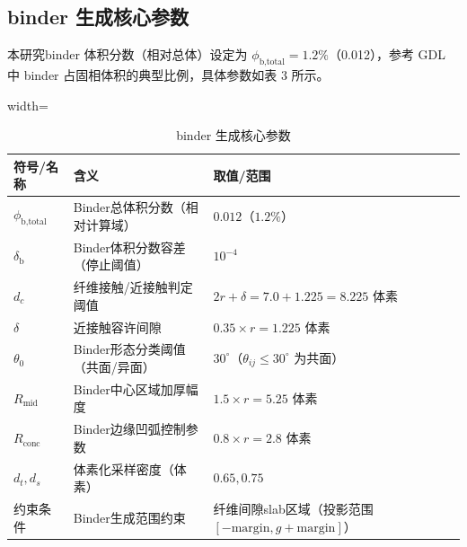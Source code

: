 \subsection{binder 生成核心参数}
{\raggedright
\hspace{2em}本研究binder 体积分数（相对总体）设定为 \(\phi_{\text{b,total}} = 1.2\%\)（0.012），参考 GDL 中 binder 占固相体积的典型比例，具体参数如表 3 所示。
\par}
\begin{table}[H]
\centering
\begingroup
\small
\setlength{\tabcolsep}{6pt}
\renewcommand{\arraystretch}{1.15}
\begin{adjustbox}{width=\columnwidth}
\begin{tabular}{p{2.2cm}p{3.0cm}p{3.2cm}}
\toprule
\textbf{符号/名称} & \textbf{含义} & \textbf{取值/范围} \\
\midrule
$\phi_{\text{b,total}}$ & Binder总体积分数（相对计算域） & $0.012$（$1.2\%$） \\
$\delta_{\text{b}}$ & Binder体积分数容差（停止阈值） & $10^{-4}$ \\
$d_c$ & 纤维接触/近接触判定阈值 & $2r + \delta = 7.0 + 1.225 = 8.225$ 体素 \\
$\delta$ & 近接触容许间隙 & $0.35 \times r = 1.225$ 体素 \\
$\theta_0$ & Binder形态分类阈值（共面/异面） & $30^\circ$（$\theta_{ij} \leq 30^\circ$ 为共面） \\
$R_{\text{mid}}$ & Binder中心区域加厚幅度 & $1.5 \times r = 5.25$ 体素 \\
$R_{\text{conc}}$ & Binder边缘凹弧控制参数 & $0.8 \times r = 2.8$ 体素 \\
$d_t, d_s$ & 体素化采样密度（体素） & $0.65, 0.75$ \\
约束条件 & Binder生成范围约束 & 纤维间隙slab区域（投影范围$[-\text{margin}, g+\text{margin}]$） \\
\bottomrule
\end{tabular}
\end{adjustbox}
\endgroup
\caption{binder 生成核心参数}
\label{tab:binder_params}
\end{table}

